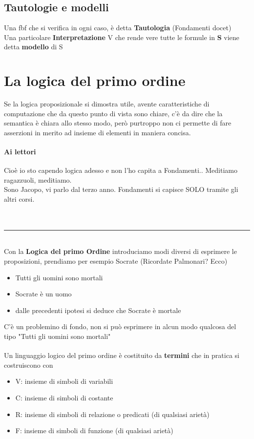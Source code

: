 \documentclass[12pt, a4paper, openany, oneside]{book}
\begin{document}
{\subsection{Tautologie e modelli}
Una fbf che si verifica in ogni caso, è detta \textbf{Tautologia} (Fondamenti
docet)\\
Una particolare \textbf{Interpretazione} V che rende vere tutte le formule in
\textbf{S} viene detta \textbf{modello} di S
\section{La logica del primo ordine}
Se la logica proposizionale si dimostra utile, avente caratteristiche di 
computazione che da questo punto di vista sono chiare, c'è da dire che la 
semantica è chiara allo stesso modo, però purtroppo non ci permette di 
fare asserzioni in merito ad insieme di elementi in maniera concisa.
\paragraph{Ai lettori} Cioè io sto capendo logica adesso e non l'ho capita a 
Fondamenti.. Meditiamo ragazzuoli, meditiamo. \\
Sono Jacopo, vi parlo dal terzo anno. Fondamenti si capisce SOLO tramite gli 
altri corsi. \\ \\
\\
{\color{black} \rule{\linewidth}{0.2mm} }
\\
Con la \textbf{Logica del primo Ordine} introduciamo modi diversi di esprimere
le proposizioni, prendiamo per esempio Socrate (Ricordate Palmonari? Ecco)\\
\begin{itemize}
	\item Tutti gli uomini sono mortali
	\item Socrate è un uomo
	\item dalle precedenti ipotesi si deduce che Socrate è mortale
\end{itemize}
C'è un problemino di fondo, non si può esprimere in alcun modo qualcosa del tipo
"Tutti gli uomini sono mortali" \\ \\
Un linguaggio logico del primo ordine è costituito da \textbf{termini} che in 
pratica si costruiscono con 	
\begin{itemize}
	\item V: insieme di simboli di variabili
	\item C: insieme di simboli di costante
	\item R: insieme di simboli di relazione o predicati (di qualsiasi arietà)
	\item F: insieme di simboli di funzione (di qualsiasi arietà)
\end{itemize}
}
\end{document}

